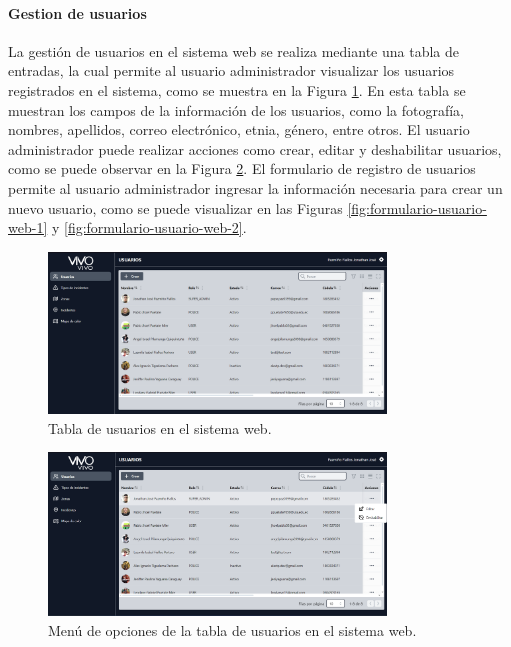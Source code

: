 \paragraph{Gestion de usuarios}
La gestión de usuarios en el sistema web se realiza mediante una tabla de entradas, la cual permite al usuario administrador
visualizar los usuarios registrados en el sistema, como se muestra en la Figura \ref{fig:tabla-usuarios-web}. En esta tabla se
muestran los campos de la información de los usuarios, como la fotografía, nombres, apellidos, correo electrónico, etnia, género,
entre otros. El usuario administrador puede realizar acciones como crear, editar y deshabilitar usuarios, como se puede observar en la Figura
\ref{fig:menu-tabla-usuarios-web}. El formulario de registro de usuarios permite al usuario administrador ingresar la información
necesaria para crear un nuevo usuario, como se puede visualizar en las Figuras \ref{fig:formulario-usuario-web-1} y \ref{fig:formulario-usuario-web-2}.

\begin{figure}[H]
    \centering
    \includegraphics[width=0.8\textwidth]{chapters/III-resultados-y-discusion/resources/images/tabla-usuarios-web.png}
    \caption{Tabla de usuarios en el sistema web.}
    \label{fig:tabla-usuarios-web}
\end{figure}

\begin{figure}[H]
    \centering
    \includegraphics[width=0.8\textwidth]{chapters/III-resultados-y-discusion/resources/images/menu-tabla-usuarios-web.png}
    \caption{Menú de opciones de la tabla de usuarios en el sistema web.}
    \label{fig:menu-tabla-usuarios-web}
\end{figure}

